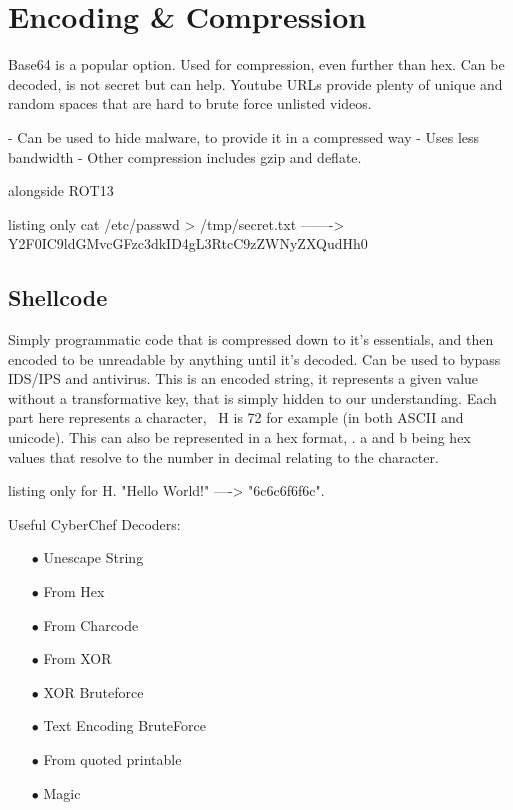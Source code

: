 \section{Encoding \& Compression}
Base64 is a popular option. Used for compression, even further than hex. Can be decoded, is not secret but can help. 
Youtube URLs provide plenty of unique and random spaces that are hard to brute force unlisted videos.

- Can be used to hide malware, to provide it in a compressed way
- Uses less bandwidth
- Other compression includes gzip and deflate.

alongside ROT13

\begin{tcblisting}{listing only}
cat /etc/passwd > /tmp/secret.txt -------> Y2F0IC9ldGMvcGFzc3dkID4gL3RtcC9zZWNyZXQudHh0
\end{tcblisting}

\subsection{Shellcode}
Simply programmatic code that is compressed down to it's essentials, and then encoded to be unreadable by anything until it's decoded. 
Can be used to bypass IDS/IPS and antivirus. This is an encoded string, it represents a given value without a transformative key, 
that is simply hidden to our understanding. Each part here represents a character,  H is 72 for example (in both ASCII and unicode). 
This can also be represented in a hex format, \xab. 
a and b being hex values that resolve to the number in decimal relating to the character. 
\begin{tcblisting}{listing only}
 for H. "Hello World!" ----> "\x6c\x6c\x6f\x6f\x6c". 
\end{tcblisting}

Useful CyberChef Decoders:
\begin{enumerate}
    \item [$\bullet$] Unescape String
    \item [$\bullet$] From Hex
    \item [$\bullet$] From Charcode
    \item [$\bullet$] From XOR
    \item [$\bullet$] XOR Bruteforce
    \item [$\bullet$] Text Encoding BruteForce
    \item [$\bullet$] From quoted printable
    \item [$\bullet$] Magic
\end{enumerate}

